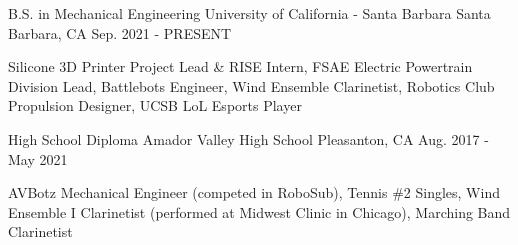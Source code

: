 


\begin{cventries}

\cventry
{B.S. in Mechanical Engineering} %
{University of California - Santa Barbara} %
{Santa Barbara, CA} %
{Sep. 2021 - PRESENT} %
{ %
\begin{cvitems}
\item {Silicone 3D Printer Project Lead \& RISE Intern, FSAE Electric Powertrain Division Lead, Battlebots Engineer, Wind Ensemble Clarinetist, Robotics Club Propulsion Designer, UCSB LoL Esports Player}
\end{cvitems}
}

\cventry
{High School Diploma} %
{Amador Valley High School} %
{Pleasanton, CA} %
{Aug. 2017 - May 2021} %
{ %
\begin{cvitems}
\item{AVBotz Mechanical Engineer (competed in RoboSub), Tennis \#2 Singles, Wind Ensemble I Clarinetist (performed at Midwest Clinic in Chicago), Marching Band Clarinetist}
\end{cvitems}
}




\end{cventries}